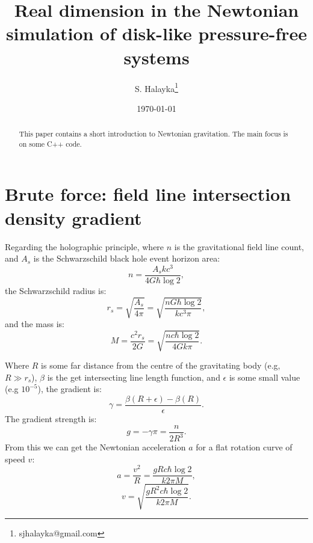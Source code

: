 \documentclass[12pt]{article}
\title{Real dimension in the Newtonian simulation of disk-like pressure-free systems}
\author{S. Halayka\footnote{sjhalayka@gmail.com}}
\date{\today\;\currenttime}
\begin{document}
 
\maketitle

\begin{abstract}
This paper contains a short introduction to Newtonian gravitation.
The main focus is on some C++ code.
\end{abstract}






\section{Brute force: field line intersection density gradient}
Regarding the holographic principle, where $n$ is the gravitational field line count, and $A_s$ is the Schwarzschild black hole event horizon area:
\begin{equation}
n = \frac{A_s k c^3}{ 4 G \hbar \log 2},
\end{equation}
the Schwarzschild radius is:
\begin{equation}
r_s = \sqrt{\frac{A_s}{4 \pi}} = \sqrt{\frac{n G \hbar \log 2}{k c^3 \pi}},
\end{equation}
and the mass is:
\begin{equation}
M = \frac{c^2 r_s}{2 G} = \sqrt{\frac{n c \hbar \log 2}{4 G k \pi}}. 
\end{equation}

Where $R$ is some far distance from the centre of the gravitating body (e.g, $R \gg r_s$), $\beta$ is the get intersecting line length function, and $\epsilon$ is some small value (e.g $10^{-5}$), the gradient is:
\begin{equation}
\gamma = \frac{\beta(R + \epsilon) - \beta(R)}{\epsilon}.
\end{equation}
The gradient strength is:
\begin{equation}
g = -\gamma \pi = \frac{n}{2 R^3}.
\end{equation}
From this we can get the Newtonian acceleration $a$ for a flat rotation curve of speed $v$:
\begin{equation}
\label{a_equation}
a = \frac{v^2}{R} = \frac{g R c \hbar \log 2}{k 2 \pi M},
\end{equation}
\begin{equation}
v = \sqrt{\frac{g R^2 c \hbar \log 2}{k 2 \pi M}}.
\end{equation}
\end{document}
